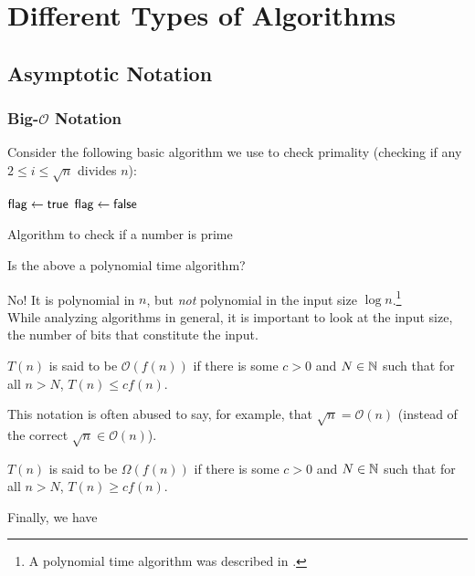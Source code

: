 \section{Different Types of Algorithms}

\subsection{Asymptotic Notation}

\subsubsection{Big-\texorpdfstring{$\mathcal{O}$}{O} Notation}

Consider the following basic algorithm we use to check primality (checking if any $2\leq i\leq \sqrt{n}$ divides $n$):

\begin{algorithm}
	\DontPrintSemicolon
	$\mathsf{flag}\gets\mathsf{true}$\;
	 {
		 {
			$\mathsf{flag}\gets\mathsf{false}$
		}
	}
	\caption{Algorithm to check if a number is prime}
\end{algorithm}

Is the above a polynomial time algorithm?

No! It is polynomial in $n$, but \textit{not} polynomial in the input size $\log n$.\footnote{A polynomial time algorithm was described in \cite{AKS-primality}.}\\
While analyzing algorithms in general, it is important to look at the input size, the number of bits that constitute the input.

\begin{definition}
$T(n)$ is said to be $\mathcal{O}(f(n))$ if there is some $c> 0$ and $N\in\mathbb{N}$ such that for all $n>N$, $T(n)\leq cf(n)$.
\end{definition}

This notation is often abused to say, for example, that $\sqrt{n} = \mathcal{O}(n)$ (instead of the correct $\sqrt{n}\in\mathcal{O}(n)$).

\begin{definition}
$T(n)$ is said to be $\Omega(f(n))$ if there is some $c> 0$ and $N\in\mathbb{N}$ such that for all $n>N$, $T(n)\geq cf(n)$.
\end{definition}

Finally, we have

